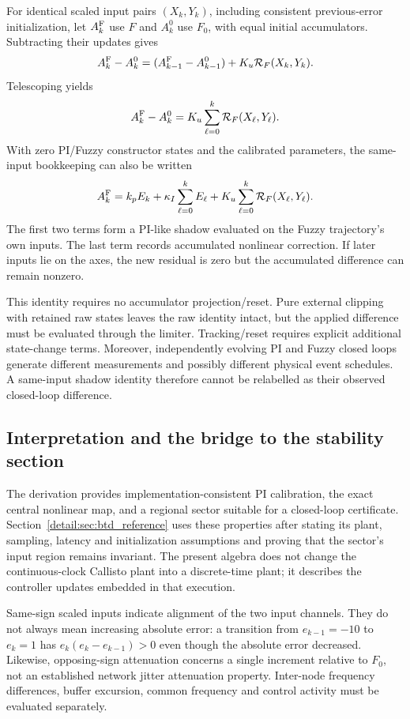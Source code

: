 For identical scaled input pairs $(X_k,Y_k)$, including consistent
previous-error initialization, let $A_k^{\rm F}$ use $F$ and
$A_k^0$ use $F_0$, with equal initial accumulators. Subtracting their
updates gives
\[
 A_k^{\rm F}-A_k^0=(A_{k-1}^{\rm F}-A_{k-1}^0)
                  +K_u\mathcal R_F(X_k,Y_k).
\]
Telescoping yields
\begin{equation}
 A_k^{\rm F}-A_k^0=K_u\sum_{\ell=0}^{k}\mathcal R_F(X_\ell,Y_\ell).
 \label{detail:eq:fpi_memory}
\end{equation}
With zero PI/Fuzzy constructor states and the calibrated parameters,
the same-input bookkeeping can also be written
\begin{equation}
 A_k^{\rm F}=k_pE_k+\kappa_I\sum_{\ell=0}^{k}E_\ell
             +K_u\sum_{\ell=0}^{k}\mathcal R_F(X_\ell,Y_\ell).
 \label{detail:eq:fpd_accounting}
\end{equation}
The first two terms form a PI-like shadow evaluated on the Fuzzy
trajectory's own inputs. The last term records accumulated nonlinear
correction. If later inputs lie on the axes, the new residual is zero
but the accumulated difference can remain nonzero.

This identity requires no accumulator projection/reset. Pure external
clipping with retained raw states leaves the raw identity intact, but the
applied difference must be evaluated through the limiter. Tracking/reset
requires explicit additional state-change terms. Moreover, independently
evolving PI and Fuzzy closed loops generate different measurements and
possibly different physical event schedules. A same-input shadow identity
therefore cannot be relabelled as their observed closed-loop difference.

\subsection{Interpretation and the bridge to the stability section}

The derivation provides implementation-consistent PI calibration,
the exact central nonlinear map, and a regional sector suitable for a
closed-loop certificate. Section~\ref{detail:sec:btd_reference} uses these properties after stating its
plant, sampling, latency and initialization assumptions and proving that
the sector's input region remains invariant. The present algebra does not
change the continuous-clock Callisto plant into a discrete-time plant;
it describes the controller updates embedded in that execution.

Same-sign scaled inputs indicate alignment of the two input channels.
They do not always mean increasing absolute error: a transition from
$e_{k-1}=-10$ to $e_k=1$ has $e_k(e_k-e_{k-1})>0$ even though the
absolute error decreased. Likewise, opposing-sign attenuation concerns a
single increment relative to $F_0$, not an established network jitter
attenuation property. Inter-node frequency differences, buffer excursion, common
frequency and control activity must be evaluated separately.


